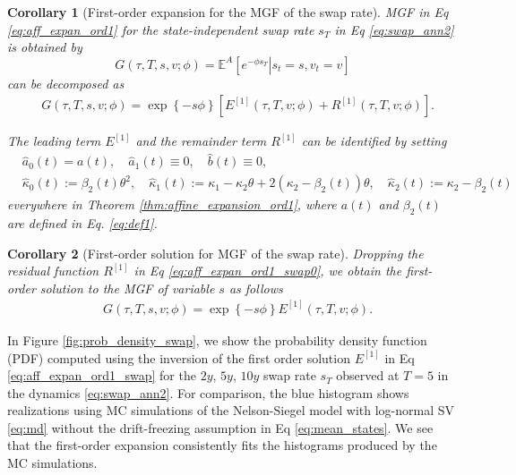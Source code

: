 \documentclass[pdftex,11pt,a4paper] {article}
\newtheorem{corollary}{Corollary}[section]
\begin{document}
\begin{corollary}[First-order expansion for the MGF of the swap rate] MGF in Eq \eqref{eq:aff_expan_ord1} for the {\rm state-independent} swap rate $s_T$ in Eq \eqref{eq:swap_ann2} is obtained by
\begin{equation*}
G(\tau,T,s,v;\phi)=\mathbb{E}^A\left[\left.e^{-\phi s_T}\right|s_t=s,v_t=v\right]
\end{equation*}
can be decomposed as 
\begin{equation}\label{eq:aff_expan_ord1_swap0}
\begin{split}
& G(\tau,T,s,v;\phi)= \exp\left\{ -s\phi \right\} \left[ E^{[1]}(\tau,T,v;\phi) + R^{[1]}(\tau,T,v;\phi)\right].
\end{split}
\end{equation}

The leading term $E^{[1]}$ and the remainder term $R^{[1]}$ can be identified by setting
\begin{equation*}
\begin{split}
&\hat a_0(t)=a(t),\quad \hat a_1(t)\equiv 0,\quad \hat b(t)\equiv 0,\\
&\hat\kappa_0(t):=\beta_2(t)\theta^2, \quad \hat\kappa_1(t):=\kappa_1-\kappa_2\theta+2(\kappa_2-\beta_2(t))\theta, \quad \hat\kappa_2(t):=\kappa_2-\beta_2(t)
\end{split}
\end{equation*}
everywhere in Theorem \ref{thm:affine_expansion_ord1}, where $a(t)$ and $\beta_2(t)$ are defined in Eq. \eqref{eq:def1}. 
\end{corollary}


\begin{corollary}[First-order solution for MGF of the swap rate]
Dropping the residual function $R^{[1]}$ in Eq \eqref{eq:aff_expan_ord1_swap0}, we obtain the first-order solution to the MGF of variable $s$ as follows
\begin{equation}\label{eq:aff_expan_ord1_swap}
\begin{split}
& G(\tau,T,s,v;\phi)= \exp\left\{ -s\phi \right\}   E^{[1]}(\tau,T,v;\phi).
\end{split}
\end{equation}
\end{corollary}





In Figure \ref{fig:prob_density_swap}, we show the probability density function (PDF) computed using the inversion of the first order solution $E^{[1]}$ in Eq \eqref{eq:aff_expan_ord1_swap} for the $2y$, $5y$, $10y$ swap rate $s_T$ observed at $T=5$ in the dynamics \eqref{eq:swap_ann2}. 
For comparison, the blue histogram shows realizations using MC simulations of the Nelson-Siegel model with log-normal SV \eqref{eq:md} without the drift-freezing assumption in Eq \eqref{eq:mean_states}. We see that the first-order expansion consistently fits the histograms produced by the MC simulations. 
\end{document}
